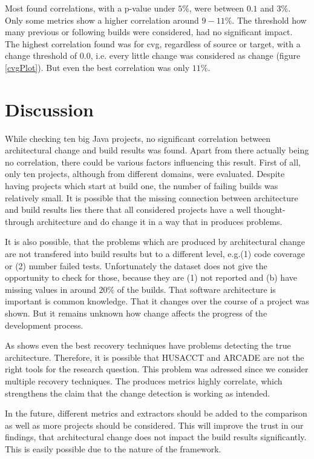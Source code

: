 \documentclass[conference]{IEEEtran}
\begin{document}
Most found correlations, with a p-value under $5\%$, were between $0.1$ and $3\%$. Only some metrics show a higher correlation around $9-11\%$. The threshold how many previous or following builds were considered, had no significant impact. The highest correlation found was for cvg, regardless of source or target, with a change threshold of $0.0$, i.e. every little change was considered as change (figure \ref{cvgPlot}). But even the best correlation was only $11\%$.

\section{Discussion}

While checking ten big Java projects, no significant correlation between architectural change and build results was found. Apart from there actually being no correlation, there could be various factors influencing this result. First of all, only ten projects, although from different domains, were evaluated. Despite having projects which start at build one, the number of failing builds was relatively small. It is possible that the missing connection between architecture and build results lies there that all considered projects have a well thought-through architecture and do change it in a way that in produces problems. 

It is also possible, that the problems which are produced by architectural change are not transfered into build results but to a different level, e.g.(1) code coverage or (2) number failed tests. Unfortunately the dataset does not give the opportunity to check for those, because they are (1) not reported and (b) have missing values in around $20\%$ of the builds. That software architecture is important is common knowledge. That it changes over the course of a project was shown. But it remains unknown how change affects the progress of the development process. 

As \cite{arcRec-comparison} shows even the best recovery techniques have problems detecting the true architecture. Therefore, it is possible that HUSACCT and ARCADE are not the right tools for the research question. This problem was adressed since we consider multiple recovery techniques. The produces metrics highly correlate, which strengthens the claim that the change detection is working as intended. 

In the future, different metrics and extractors should be added to the comparison as well as more projects should be considered. This will improve the trust in our findings, that architectural change does not impact the build results significantly. This is easily possible due to the nature of the framework.
\end{document}
